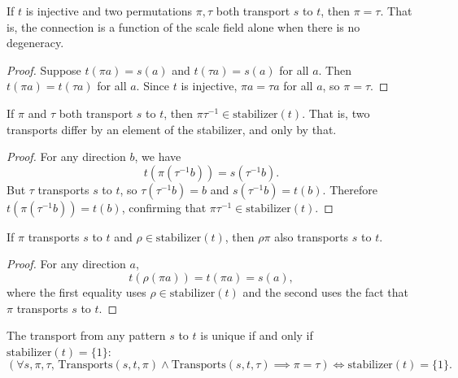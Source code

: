 \begin{theorem}
If $t$ is injective and two permutations $\pi, \tau$ both transport $s$ to $t$, then $\pi = \tau$. That is, the connection is a function of the scale field alone when there is no degeneracy.
\end{theorem}

\begin{proof}
Suppose $t(\pi a) = s(a)$ and $t(\tau a) = s(a)$ for all $a$. Then $t(\pi a) = t(\tau a)$ for all $a$. Since $t$ is injective, $\pi a = \tau a$ for all $a$, so $\pi = \tau$.
\end{proof}

\begin{theorem}
If $\pi$ and $\tau$ both transport $s$ to $t$, then $\pi \tau^{-1} \in \mathrm{stabilizer}(t)$. That is, two transports differ by an element of the stabilizer, and only by that.
\end{theorem}

\begin{proof}
For any direction $b$, we have
\[ t(\pi(\tau^{-1} b)) = s(\tau^{-1} b). \]
But $\tau$ transports $s$ to $t$, so $\tau(\tau^{-1} b) = b$ and $s(\tau^{-1} b) = t(b)$. Therefore $t(\pi(\tau^{-1} b)) = t(b)$, confirming that $\pi \tau^{-1} \in \mathrm{stabilizer}(t)$.
\end{proof}

\begin{theorem}
If $\pi$ transports $s$ to $t$ and $\rho \in \mathrm{stabilizer}(t)$, then $\rho \pi$ also transports $s$ to $t$.
\end{theorem}

\begin{proof}
For any direction $a$,
\[ t(\rho(\pi a)) = t(\pi a) = s(a), \]
where the first equality uses $\rho \in \mathrm{stabilizer}(t)$ and the second uses the fact that $\pi$ transports $s$ to $t$.
\end{proof}

\begin{theorem}
The transport from any pattern $s$ to $t$ is unique if and only if $\mathrm{stabilizer}(t) = \{1\}$:
\[ \left(\forall s, \pi, \tau, \, \mathrm{Transports}(s, t, \pi) \land \mathrm{Transports}(s, t, \tau) \implies \pi = \tau\right) \iff \mathrm{stabilizer}(t) = \{1\}. \]
\end{theorem}

